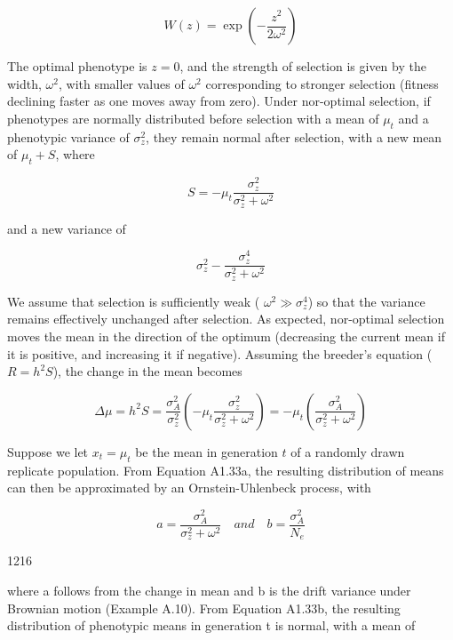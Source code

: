 \documentclass{article}
\begin{document}
\begin{equation}
W(z)=\exp\left(-\frac{z^{2}}{2\omega^{2}}\right)
\end{equation}

The optimal phenotype is $z = 0$, and the strength of selection is given by the width, $\omega^2$, with smaller values of $\omega^2$ corresponding to stronger selection (fitness declining faster as one moves away from zero). Under nor-optimal selection, if phenotypes are normally distributed before selection with a mean of $\mu_t$ and a phenotypic variance of $\sigma_z^2$, they remain normal after selection, with a new mean of $\mu_t + S$, where

\begin{equation}
S=-\mu_{t}\frac{\sigma_{z}^{2}}{\sigma_{z}^{2}+\omega^{2}}
\end{equation}

and a new variance of

\begin{equation}
\sigma_{z}^{2}-\frac{\sigma_{z}^{4}}{\sigma_{z}^{2}+\omega^{2}}
\end{equation}

We assume that selection is sufficiently weak ( $ \omega^2 \gg \sigma_z^4 $) so that the variance remains effectively unchanged after selection. As expected, nor-optimal selection moves the mean in the direction of the optimum (decreasing the current mean if it is positive, and increasing it if negative). Assuming the breeder's equation ( $ R = h^2 S $), the change in the mean becomes

\begin{equation}
\Delta\mu=h^{2}S=\frac{\sigma_{A}^{2}}{\sigma_{z}^{2}}\left(-\mu_{t}\frac{\sigma_{z}^{2}}{\sigma_{z}^{2}+\omega^{2}}\right)=-\mu_{t}\left(\frac{\sigma_{A}^{2}}{\sigma_{z}^{2}+\omega^{2}}\right)
\end{equation}

Suppose we let  $ x_t = \mu_t $ be the mean in generation  $ t $ of a randomly drawn replicate population. From Equation A1.33a, the resulting distribution of means can then be approximated by an Ornstein-Uhlenbeck process, with

\begin{equation}
a=\frac{\sigma_{A}^{2}}{\sigma_{z}^{2}+\omega^{2}}\quad and\quad b=\frac{\sigma_{A}^{2}}{N_{e}}
\end{equation}

1216

where a follows from the change in mean and b is the drift variance under Brownian motion (Example A.10). From Equation A1.33b, the resulting distribution of phenotypic means in generation t is normal, with a mean of
\end{document}
